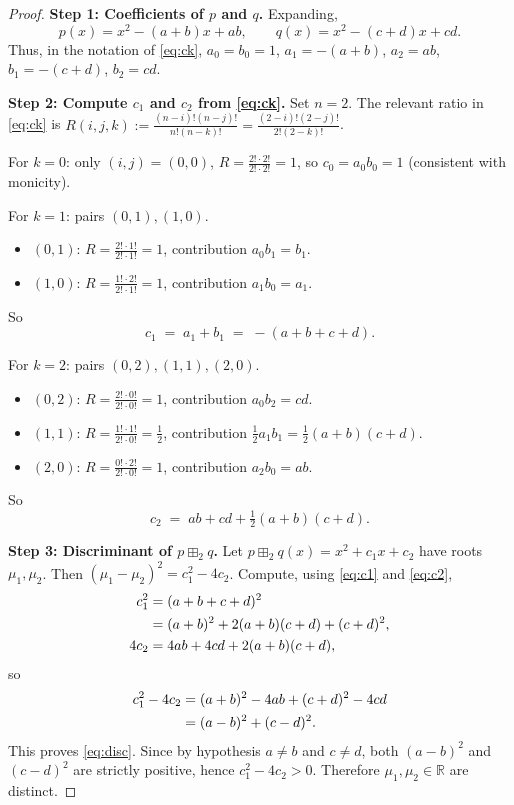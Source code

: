 \documentclass[12pt]{article}
\theoremstyle{definition}
\begin{document}
\begin{proof}
\textbf{Step 1: Coefficients of $p$ and $q$.}
Expanding,
\[
p(x) = x^2 - (a+b)x + ab, \qquad q(x) = x^2 - (c+d)x + cd.
\]
Thus, in the notation of \eqref{eq:ck}, $a_0=b_0=1$, $a_1=-(a+b)$, $a_2=ab$, $b_1=-(c+d)$, $b_2=cd$.

\textbf{Step 2: Compute $c_1$ and $c_2$ from \eqref{eq:ck}.}
Set $n=2$. The relevant ratio in \eqref{eq:ck} is $R(i,j,k):=\frac{(n-i)!(n-j)!}{n!(n-k)!}=\frac{(2-i)!(2-j)!}{2!(2-k)!}$.

For $k=0$: only $(i,j)=(0,0)$, $R=\frac{2!\cdot 2!}{2!\cdot 2!}=1$, so $c_0=a_0b_0=1$ (consistent with monicity).

For $k=1$: pairs $(0,1),(1,0)$.
\begin{itemize}
\item $(0,1)$: $R=\frac{2!\cdot 1!}{2!\cdot 1!}=1$, contribution $a_0b_1=b_1$.
\item $(1,0)$: $R=\frac{1!\cdot 2!}{2!\cdot 1!}=1$, contribution $a_1b_0=a_1$.
\end{itemize}
So
\begin{equation}\label{eq:c1}
c_1 \;=\; a_1+b_1 \;=\; -(a+b+c+d).
\end{equation}

For $k=2$: pairs $(0,2),(1,1),(2,0)$.
\begin{itemize}
\item $(0,2)$: $R=\frac{2!\cdot 0!}{2!\cdot 0!}=1$, contribution $a_0b_2=cd$.
\item $(1,1)$: $R=\frac{1!\cdot 1!}{2!\cdot 0!}=\tfrac{1}{2}$, contribution $\tfrac{1}{2}a_1b_1=\tfrac{1}{2}(a+b)(c+d)$.
\item $(2,0)$: $R=\frac{0!\cdot 2!}{2!\cdot 0!}=1$, contribution $a_2b_0=ab$.
\end{itemize}
So
\begin{equation}\label{eq:c2}
c_2 \;=\; ab+cd+\tfrac{1}{2}(a+b)(c+d).
\end{equation}

\textbf{Step 3: Discriminant of $p\boxplus_2 q$.}
Let $p\boxplus_2 q(x)=x^2+c_1x+c_2$ have roots $\mu_1,\mu_2$. Then $(\mu_1-\mu_2)^2=c_1^2-4c_2$. Compute, using \eqref{eq:c1} and \eqref{eq:c2},
\begin{align}
c_1^2 &= (a+b+c+d)^2 \notag\\
      &= (a+b)^2 + 2(a+b)(c+d) + (c+d)^2,\label{eq:c1sq}\\
4c_2  &= 4ab+4cd+2(a+b)(c+d),\label{eq:4c2}
\end{align}
so
\begin{align}
c_1^2 - 4c_2
&= (a+b)^2 - 4ab + (c+d)^2 - 4cd \notag\\
&= (a-b)^2 + (c-d)^2.\label{eq:discproof}
\end{align}
This proves \eqref{eq:disc}. Since by hypothesis $a\neq b$ and $c\neq d$, both $(a-b)^2$ and $(c-d)^2$ are strictly positive, hence $c_1^2-4c_2>0$. Therefore $\mu_1,\mu_2\in\mathbb{R}$ are distinct.


\end{proof}
\end{document}
